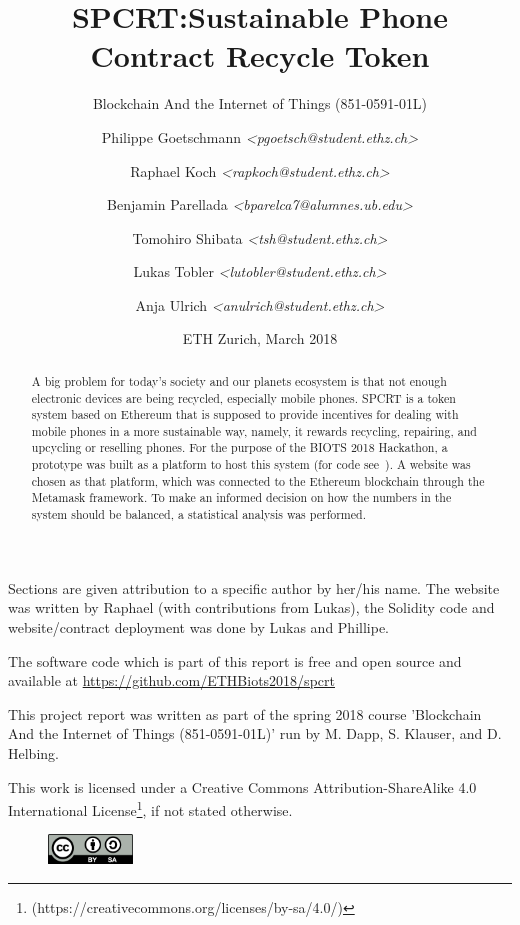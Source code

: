 \documentclass[11pt]{scrartcl}
\title{SPCRT:\@ Sustainable Phone Contract Recycle Token}
\subtitle{Blockchain And the Internet of Things (851-0591-01L)}
\author{%
    Philippe Goetschmann \textit{\textless pgoetsch@student.ethz.ch\textgreater}%
    \and
    Raphael Koch \textit{\textless rapkoch@student.ethz.ch\textgreater}%
    \and
    Benjamin Parellada \textit{\textless bparelca7@alumnes.ub.edu\textgreater}%
    \and
    Tomohiro Shibata \textit{\textless tsh@student.ethz.ch\textgreater}%
    \and
    Lukas Tobler \textit{\textless lutobler@student.ethz.ch\textgreater}%
    \and
    Anja Ulrich \textit{\textless anulrich@student.ethz.ch\textgreater}%
}
\date{ETH Zurich, March 2018}
\begin{document}
%
\maketitle
%
\begin{center}
Sections are given attribution to a specific author by her/his name. The website was written by Raphael (with contributions from Lukas), the Solidity code and website/contract deployment was done by Lukas and Phillipe.

\vspace{2mm}
The software code which is part of this report is free and open source and available at \url{https://github.com/ETHBiots2018/spcrt}

\vspace{2mm}
This project report was written as part of the spring 2018 course 'Blockchain And the Internet of Things (851-0591-01L)' run by M. Dapp, S. Klauser, and D. Helbing.

\vspace{2mm}
This work is licensed under a Creative Commons Attribution-ShareAlike 4.0
International License\footnote{(https://creativecommons.org/licenses/by-sa/4.0/)},
if not stated otherwise.
\end{center}

\begin{center}
    \begin{figure}[h]
        \centering
        \includegraphics[width=0.2\textwidth]{img/cc_license.png}
        \vspace{-0.2cm}
    \end{figure}
\end{center}

\pagebreak

\begin{abstract}
    A big problem for today's society and our planets ecosystem is that not
    enough electronic devices are being recycled, especially mobile phones.
    SPCRT is a token system based on Ethereum that is supposed to provide
    incentives for dealing with mobile phones in a more sustainable way, namely,
    it rewards recycling, repairing, and upcycling or reselling phones.  For
    the purpose of the BIOTS 2018 Hackathon, a prototype was built as a platform
    to host this system (for code see~\cite{spcgit}).  A website was chosen as that
    platform, which was connected to the Ethereum blockchain through the
    Metamask framework. To make an informed decision on how the numbers in the
    system should be balanced, a statistical analysis was performed.
\end{abstract}
\end{document}
